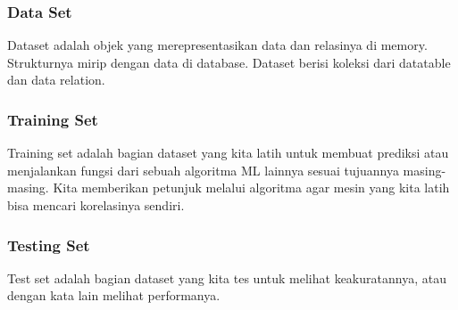 \subsubsection{Data Set}
\hfill\break
Dataset adalah objek yang merepresentasikan data dan relasinya di memory. Strukturnya mirip dengan data di database. Dataset berisi koleksi dari datatable dan data relation.
\subsubsection{Training Set}
\hfill\break
Training set adalah bagian dataset yang kita latih untuk membuat prediksi atau menjalankan fungsi dari sebuah algoritma ML lainnya sesuai tujuannya masing-masing. Kita memberikan petunjuk melalui algoritma agar mesin yang kita latih bisa mencari korelasinya sendiri. 
\subsubsection{Testing Set}
\hfill\break
Test set adalah bagian dataset yang kita tes untuk melihat keakuratannya, atau dengan kata lain melihat performanya.
